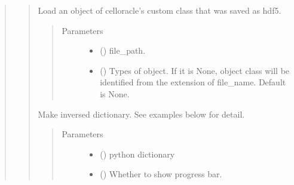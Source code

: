 \documentclass[letterpaper,10pt,english]{sphinxmanual}
\begin{document}
\begin{quote}
\begin{quote}
\begin{fulllineitems}
\label{\detokenize{modules/celloracle.utility:celloracle.utility.load_hdf5}}
Load an object of celloracle’s custom class that was saved as hdf5.
\begin{quote}\begin{description}
\item[{Parameters}] \leavevmode\begin{itemize}
\item {} 
 () \textendash{} file\_path.

\item {} 
 () \textendash{} Types of object.
If it is None, object class will be identified from the extension of file\_name.
Default is None.

\end{itemize}

\end{description}\end{quote}

\end{fulllineitems}


\begin{fulllineitems}
\label{\detokenize{modules/celloracle.utility:celloracle.utility.inverse_dictionary}}
Make inversed dictionary.
See examples below for detail.
\begin{quote}\begin{description}
\item[{Parameters}] \leavevmode\begin{itemize}
\item {} 
 () \textendash{} python dictionary

\item {} 
 () \textendash{} Whether to show progress bar.


\end{itemize}
\end{description}
\end{quote}
\end{fulllineitems}
\end{quote}
\end{quote}
\end{document}
